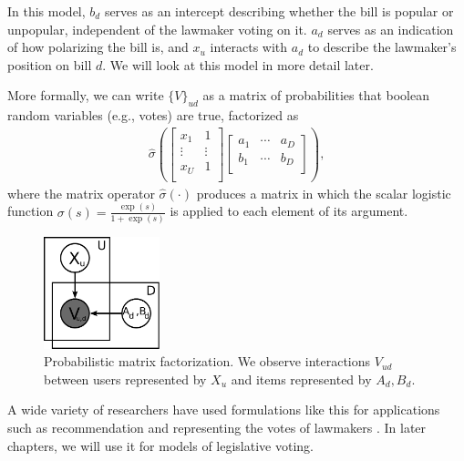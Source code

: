 In this model, $b_d$ serves as an intercept describing whether the
bill is popular or unpopular, independent of the lawmaker voting on
it.  $a_d$ serves as an indication of how polarizing the bill is, and
$x_u$ interacts with $a_d$ to describe the lawmaker's position on bill
$d$.  We will look at this model in more detail later.

More formally, we can write $\{V\}_{ud}$ as a matrix of probabilities
that boolean random variables (e.g., votes) are true, factorized as
\begin{align}
  \hat \sigma \left( \left[ \begin{array}{cc}
    x_1 & 1 \\
    \vdots & \vdots \\
    x_U & 1 \\
  \end{array}
  \right]
  \left[
    \begin{array}{ccc}
      a_1 & \cdots & a_D \\
      b_1 & \cdots & b_D \\
    \end{array}
    \right]
  \right),
\end{align}
where the matrix operator $\hat \sigma(\cdot)$ produces a matrix in
which the scalar logistic function $\sigma(s) = \frac{\exp(s)}{1 +
  \exp(s)}$ is applied to each element of its argument.

\begin{figure}
  \begin{center}
  \includegraphics[width=0.3\textwidth]{chapter_introductory_material/figs/irt_gm.pdf}
  \end{center}
  \caption{Probabilistic matrix factorization.  We observe
    interactions $V_{ud}$ between users represented by $X_u$ and items
    represented by $A_d, B_d$.}
  \label{fig:irt_gm}
\end{figure}

A wide variety of researchers have used formulations like this for
applications such as recommendation and representing the votes of
lawmakers
\citep{wang:2011,salakhutdinov:2008a,poole:1985,poole:1991,clinton:2004}. In
later chapters, we will use it for models of legislative voting.

